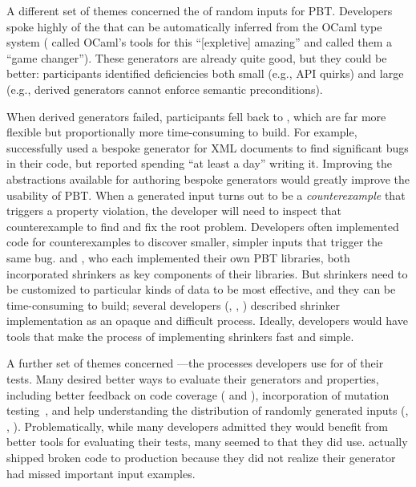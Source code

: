 A different set of themes concerned the  of
random inputs for PBT. Developers spoke
highly of the  that can be automatically
inferred from
the OCaml type system ( called OCaml's tools for this
``[expletive] amazing'' and  called them a ``game changer'').
These generators are already quite good, but they could be better: participants
identified deficiencies both small (e.g., API quirks) and large (e.g.,
derived generators
cannot enforce semantic preconditions).

When derived generators
failed, participants fell back to , which
are far more flexible but proportionally more time-consuming to
build. For example,  successfully used a bespoke
generator for XML documents to find significant bugs in their code,
but reported spending ``at least a day'' writing it.
Improving the abstractions available for authoring bespoke generators would
greatly improve the usability of PBT.
%
When a generated input turns out to be a {\em counterexample} that triggers
a property violation, the developer will need to inspect that
counterexample to find
and fix the root problem. Developers often implemented code for
 counterexamples to discover smaller,
simpler inputs that trigger the same bug.  
and , who each implemented their own PBT libraries, both
incorporated shrinkers as key components of their libraries. But
shrinkers need to be customized to particular kinds of data to be most
effective, and they can be time-consuming to build; several
developers
(,  , )
described shrinker implementation as an opaque and difficult process.
Ideally, developers would have tools that make the process of implementing
shrinkers fast and simple.

A further set of themes concerned
---the processes developers use
for  of their tests. Many
desired
better ways to evaluate their generators and properties, including
better feedback on code coverage ( and ),
incorporation of mutation
testing~\cite{papadakis_mutation_2018}, and help understanding the
distribution of randomly generated
inputs (, , ). Problematically,
while many developers admitted they would benefit from better tools for
evaluating their tests, many seemed to
 that they did use.  actually shipped broken code to production because
they did not realize their generator had missed important input
examples.

